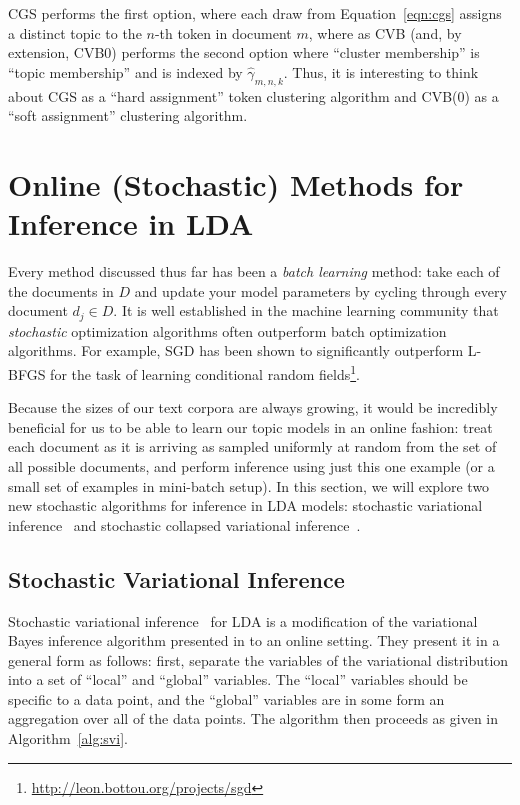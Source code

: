 \documentclass[11pt]{article}
\begin{document}
CGS performs the first option, where each draw from Equation~\ref{eqn:cgs}
assigns a distinct topic to the $n$-th token in document $m$, where as CVB
(and, by extension, CVB0) performs the second option where ``cluster
membership'' is ``topic membership'' and is indexed by
$\hat{\gamma}_{m,n,k}$. Thus, it is interesting to think about CGS as a
``hard assignment'' token clustering algorithm and CVB(0) as a ``soft
assignment'' clustering algorithm.

\section{Online (Stochastic) Methods for Inference in LDA}

Every method discussed thus far has been a \emph{batch learning} method:
take each of the documents in $D$ and update your model parameters by
cycling through every document $d_j \in D$. It is well established in the
machine learning community that \emph{stochastic} optimization algorithms
often outperform batch optimization algorithms. For example, SGD has been
shown to significantly outperform L-BFGS for the task of learning
conditional random
fields\footnote{\url{http://leon.bottou.org/projects/sgd}}.

Because the sizes of our text corpora are always growing, it would be
incredibly beneficial for us to be able to learn our topic models in an
online fashion: treat each document as it is arriving as sampled uniformly
at random from the set of all possible documents, and perform inference
using just this one example (or a small set of examples in mini-batch
setup). In this section, we will explore two new stochastic algorithms for
inference in LDA models: stochastic variational
inference~\cite{Hoffman:2013:svb} and stochastic collapsed variational
inference~\cite{Foulds:2013:scvb}.

\subsection{Stochastic Variational Inference}
Stochastic variational inference~\cite{Hoffman:2013:svb} for LDA is a
modification of the variational Bayes inference algorithm presented
in \citet{Blei:2003:LDA} to an online setting. They present it in a general
form as follows: first, separate the variables of the variational
distribution into a set of ``local'' and ``global'' variables. The
``local'' variables should be specific to a data point, and the ``global''
variables are in some form an aggregation over all of the data points. The
algorithm then proceeds as given in Algorithm~\ref{alg:svi}.
\end{document}
